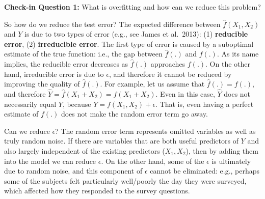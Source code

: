 \documentclass{book}
\newenvironment{shaded*}{
    \begin{center}
    \begin{tabular}{|p{0.9\textwidth}|}
    \hline\\
    }
    { 
    \\\\\hline
    \end{tabular} 
    \end{center}
}
\begin{document}
\begin{shaded*}

\textbf{Check-in Question 1:} What is overfitting and how can we reduce this
problem?

\end{shaded*}

So how do we reduce the test error? The expected difference between
\(\hat{f}(X_{1},X_{2})\) and \(Y\) is due to two types of error (e.g., see
James et al.~2013): (1) \textbf{reducible error}, (2) \textbf{irreducible
error}. The first type of error is caused by a suboptimal estimate of the true
function: i.e., the gap between \(\hat{f}(.)\) and \(f(.)\). As its name
implies, the reducible error decreases as \(\hat{f}(.)\) approaches \(f(.)\).
On the other hand, irreducible error is due to \(\epsilon\), and therefore it
cannot be reduced by improving the quality of \(\hat{f}(.)\). For example, let
us assume that \(\hat{f}(.) = f(.)\), and therefore
\(\hat{Y} = \hat{f}( X_{1}+X_{2}) = f(X_{1}+X_{2})\). Even in this case,
\(\hat{Y}\) does not necessarily equal \(Y\), because
\(Y = f(X_{1}, X_{2}) + \epsilon\). That is, even having a perfect estimate of
\(f(.)\) does not make the random error term go away.

Can we reduce \(\epsilon\)? The random error term represents omitted variables
as well as truly random noise. If there are variables that are both useful
predictors of \(Y\) and also largely independent of the existing predictors
(\(X_{1},X_{2}\)), then by adding them into the model we can reduce
\(\epsilon\). On the other hand, some of the \(\epsilon\) is ultimately due to
random noise, and this component of \(\epsilon\) cannot be eliminated: e.g.,
perhaps some of the subjects felt particularly well/poorly the day they were
surveyed, which affected how they responded to the survey questions.
\end{document}
